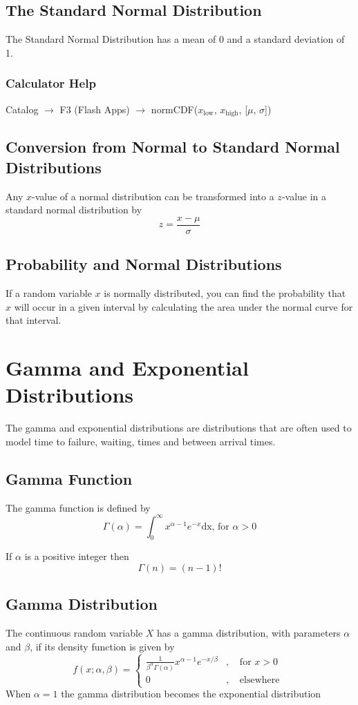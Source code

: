 \documentclass{book}
\begin{document}
\subsection{The Standard Normal Distribution}
The Standard Normal Distribution has a mean of 0 and a standard deviation of 1.

\subsubsection{Calculator Help}
Catalog $\rightarrow$ F3 (Flash Apps) $\rightarrow$ normCDF($x_\text{low}$, $x_\text{high}$, [$\mu$, $\sigma$])

\subsection{Conversion from Normal to Standard Normal Distributions}

Any $x$-value of a normal distribution can be transformed into a $z$-value in a standard normal distribution by
$$z=\frac{x-\mu}{\sigma}$$


\subsection{Probability and Normal Distributions}

If a random variable $x$ is normally distributed, you can find the probability that $x$ will occur in a given interval by calculating the area under the normal curve for that interval.
\addtocounter{section}{3}
\section{Gamma and Exponential Distributions}

The gamma and exponential distributions are distributions that are often used to model time to failure, waiting, times and between arrival times.

\subsection{Gamma Function}
The gamma function is defined by
$$\Gamma(\alpha) = \int_0^\infty x^{\alpha -1}e^{-x} \text{dx, for } \alpha > 0$$

If $\alpha$ is a positive integer then 
$$\Gamma(n) = (n-1)!$$

\subsection{Gamma Distribution}
The continuous random variable $X$ has a gamma distribution, with parameters $\alpha$ and $\beta$, if its density function is given by 
$$f(x;\alpha, \beta) = \left \{
\begin{matrix}
\frac{1}{\beta^\alpha\Gamma(\alpha)}x^{\alpha-1}e^{-x/\beta} &,& \text{ for } x >0\\
0 &,& \text{ elsewhere }
\end{matrix}
\right.
$$
When $\alpha = 1$ the gamma distribution becomes the exponential distribution
\end{document}
